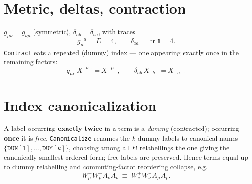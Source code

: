 \documentclass[11pt]{article}
\newcommand{\g}{g}
\newcommand{\tr}{\operatorname{tr}}
\newcommand{\code}[1]{\texttt{#1}}
\begin{document}
\section{Metric, deltas, contraction}
$\g_{\mu\nu}=\g_{\nu\mu}$ (symmetric), $\delta_{ab}=\delta_{ba}$, with traces
\begin{equation}
\g_{\mu}{}^{\mu}=D=4,\qquad \delta_{aa}=\tr\mathbb{1}=4 .
\end{equation}
\code{Contract} eats a repeated (dummy) index --- one appearing exactly once in
the remaining factors:
\begin{equation}
\g_{\mu\nu}\,X^{\cdots\nu\cdots} = X^{\cdots\mu\cdots},\qquad
\delta_{ab}\,X_{\cdots b\cdots} = X_{\cdots a\cdots}.
\end{equation}

\section{Index canonicalization}
A label occurring \textbf{exactly twice} in a term is a \emph{dummy}
(contracted); occurring \textbf{once} it is \emph{free}.
\code{Canonicalize} renames the $k$ dummy labels to canonical names
$\{\code{DUM}[1],\dots,\code{DUM}[k]\}$, choosing among all $k!$ relabellings the
one giving the canonically smallest ordered form; free labels are preserved.
Hence terms equal up to dummy relabelling and commuting-factor reordering
collapse, e.g.
\begin{equation}
W^+_\mu W^-_\mu A_\nu A_\nu \;\equiv\; W^+_\nu W^-_\nu A_\mu A_\mu .
\end{equation}

\end{document}
